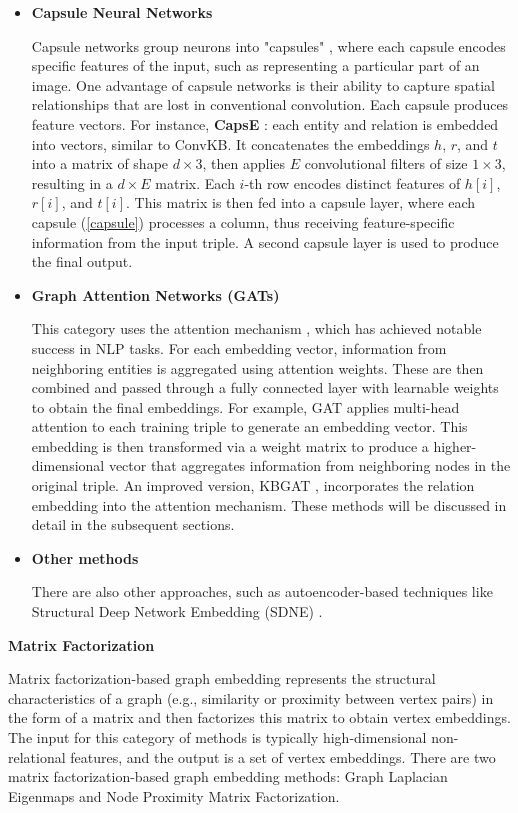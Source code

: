 \begin{itemize}
	\item \textbf{Capsule Neural Networks}
	
	Capsule networks group neurons into "capsules" \label{capsule}, where each capsule encodes specific features of the input, such as representing a particular part of an image. One advantage of capsule networks is their ability to capture spatial relationships that are lost in conventional convolution. Each capsule produces feature vectors. For instance, \textbf{CapsE} \cite{vu2019capsule}: each entity and relation is embedded into vectors, similar to ConvKB. It concatenates the embeddings $h$, $r$, and $t$ into a matrix of shape $d \times 3$, then applies $E$ convolutional filters of size $1 \times 3$, resulting in a $d \times E$ matrix. Each $i$-th row encodes distinct features of $h[i]$, $r[i]$, and $t[i]$. This matrix is then fed into a capsule layer, where each capsule (\ref{capsule}) processes a column, thus receiving feature-specific information from the input triple. A second capsule layer is used to produce the final output.
	
	\item \textbf{Graph Attention Networks (GATs)}
	
	This category uses the attention mechanism \cite{vaswani2017attention}, which has achieved notable success in NLP tasks. For each embedding vector, information from neighboring entities is aggregated using attention weights. These are then combined and passed through a fully connected layer with learnable weights to obtain the final embeddings. For example, GAT \cite{velivckovic2017graph} applies multi-head attention to each training triple to generate an embedding vector. This embedding is then transformed via a weight matrix to produce a higher-dimensional vector that aggregates information from neighboring nodes in the original triple. An improved version, KBGAT \cite{nathani2019learning}, incorporates the relation embedding into the attention mechanism. These methods will be discussed in detail in the subsequent sections.
	
	\item \textbf{Other methods}
	
	There are also other approaches, such as autoencoder-based techniques like Structural Deep Network Embedding (SDNE) \cite{wang2016structural}.
\end{itemize}




\textbf{Matrix Factorization}

Matrix factorization-based graph embedding represents the structural characteristics of a graph (e.g., similarity or proximity between vertex pairs) in the form of a matrix and then factorizes this matrix to obtain vertex embeddings. The input for this category of methods is typically high-dimensional non-relational features, and the output is a set of vertex embeddings. There are two matrix factorization-based graph embedding methods: Graph Laplacian Eigenmaps and Node Proximity Matrix Factorization.

